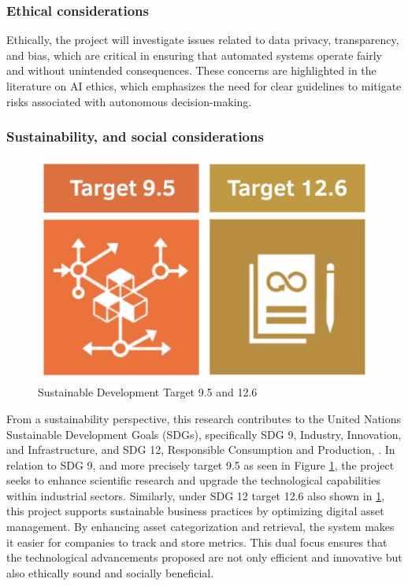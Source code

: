 \documentclass[a4paper,10pt,twocolumn]{article}
\numberwithin{figure}{section}
\numberwithin{table}{section}
\begin{document}
\vspace{0.3cm}
\subsubsection{Ethical considerations}
\vspace{0.2cm}
Ethically, the project will investigate issues related to data privacy, 
 transparency, and bias, which are critical in ensuring that 
automated systems operate fairly and without unintended consequences. 
These concerns are highlighted in the literature on AI ethics, which emphasizes 
the need for clear guidelines to mitigate risks associated with autonomous decision-making\citep{jobin2019global}.

\vspace{0.3cm}
\subsubsection{Sustainability, and social considerations}
\begin{figure}[htbp]
    \centering
    \includegraphics[width=0.48\linewidth]{targets.png}  %
    \caption{Sustainable Development Target 9.5 and 12.6}
    \label{fig:targets}  
\end{figure}

From a sustainability perspective, this research contributes to the United Nations Sustainable 
Development Goals (SDGs), specifically SDG 9, Industry, Innovation, and Infrastructure, and SDG 12, 
Responsible Consumption and Production, \citep{UN2030Agenda}. 
In relation to SDG 9, and more precisely 
target 9.5 as seen in Figure \ref{fig:targets}, the project seeks to enhance scientific 
research and upgrade the technological capabilities
 within industrial sectors. Similarly, under SDG 12 target 12.6 also shown in \ref{fig:targets}, 
 this project supports sustainable business practices by optimizing digital 
asset management. By enhancing asset categorization and retrieval, the system makes it easier 
for companies to track and store metrics. This dual focus ensures that the technological advancements 
proposed are not only efficient and innovative but also ethically sound and socially beneficial.
\end{document}
